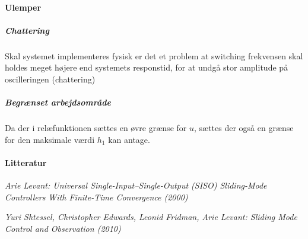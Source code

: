 \paragraph{ Ulemper }
\subparagraph{ Chattering }
	Skal systemet implementeres fysisk er det et problem at switching frekvensen
	skal holdes meget højere end systemets responstid, for at undgå stor amplitude på
	oscilleringen (chattering)
\subparagraph{ Begrænset arbejdsområde }
	Da der i relæfunktionen sættes en øvre grænse for $u$, sættes der også en
	grænse for den maksimale værdi $h_1$ kan antage.





\paragraph{ Litteratur }
\emph{
Arie Levant:
Universal Single-Input–Single-Output (SISO)
Sliding-Mode Controllers With Finite-Time
Convergence
(2000)}

\emph{
Yuri Shtessel,
Christopher Edwards,
Leonid Fridman,
Arie Levant:
Sliding Mode Control
and Observation
(2010)}
